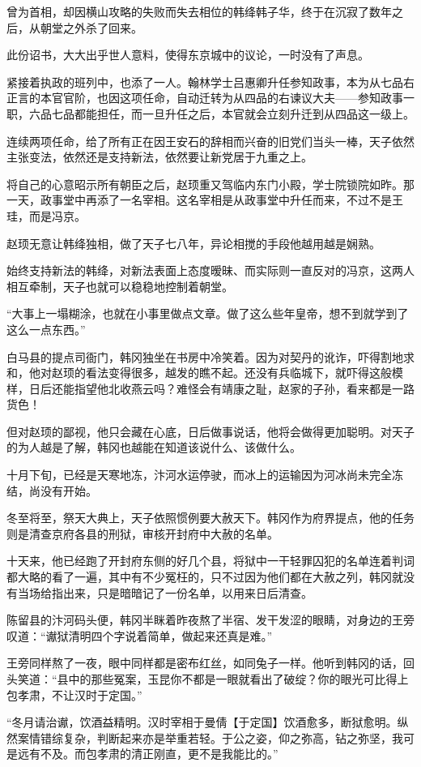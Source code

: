 曾为首相，却因横山攻略的失败而失去相位的韩绛韩子华，终于在沉寂了数年之后，从朝堂之外杀了回来。

此份诏书，大大出乎世人意料，使得东京城中的议论，一时没有了声息。

紧接着执政的班列中，也添了一人。翰林学士吕惠卿升任参知政事，本为从七品右正言的本官官阶，也因这项任命，自动迁转为从四品的右谏议大夫——参知政事一职，六品七品都能担任，而一旦升任之后，本官就会立刻升迁到从四品这一级上。

连续两项任命，给了所有正在因王安石的辞相而兴奋的旧党们当头一棒，天子依然主张变法，依然还是支持新法，依然要让新党居于九重之上。

将自己的心意昭示所有朝臣之后，赵顼重又驾临内东门小殿，学士院锁院如昨。那一天，政事堂中再添了一名宰相。这名宰相是从政事堂中升任而来，不过不是王珪，而是冯京。

赵顼无意让韩绛独相，做了天子七八年，异论相搅的手段他越用越是娴熟。

始终支持新法的韩绛，对新法表面上态度暧昧、而实际则一直反对的冯京，这两人相互牵制，天子也就可以稳稳地控制着朝堂。

“大事上一塌糊涂，也就在小事里做点文章。做了这么些年皇帝，想不到就学到了这么一点东西。”

白马县的提点司衙门，韩冈独坐在书房中冷笑着。因为对契丹的讹诈，吓得割地求和，他对赵顼的看法变得很多，越发的瞧不起。还没有兵临城下，就吓得这般模样，日后还能指望他北收燕云吗？难怪会有靖康之耻，赵家的子孙，看来都是一路货色！

但对赵顼的鄙视，他只会藏在心底，日后做事说话，他将会做得更加聪明。对天子的为人越是了解，韩冈也越能在知道该说什么、该做什么。

十月下旬，已经是天寒地冻，汴河水运停驶，而冰上的运输因为河冰尚未完全冻结，尚没有开始。

冬至将至，祭天大典上，天子依照惯例要大赦天下。韩冈作为府界提点，他的任务则是清查京府各县的刑狱，审核开封府中大赦的名单。

十天来，他已经跑了开封府东侧的好几个县，将狱中一干轻罪囚犯的名单连着判词都大略的看了一遍，其中有不少冤枉的，只不过因为他们都在大赦之列，韩冈就没有当场给指出来，只是暗暗记了一份名单，以用来日后清查。

陈留县的汴河码头便，韩冈半眯着昨夜熬了半宿、发干发涩的眼睛，对身边的王旁叹道：“谳狱清明四个字说着简单，做起来还真是难。”

王旁同样熬了一夜，眼中同样都是密布红丝，如同兔子一样。他听到韩冈的话，回头笑道：“县中的那些冤案，玉昆你不都是一眼就看出了破绽？你的眼光可比得上包孝肃，不让汉时于定国。”

“冬月请治谳，饮酒益精明。汉时宰相于曼倩【于定国】饮酒愈多，断狱愈明。纵然案情错综复杂，判断起来亦是举重若轻。于公之姿，仰之弥高，钻之弥坚，我可是远有不及。而包孝肃的清正刚直，更不是我能比的。”

